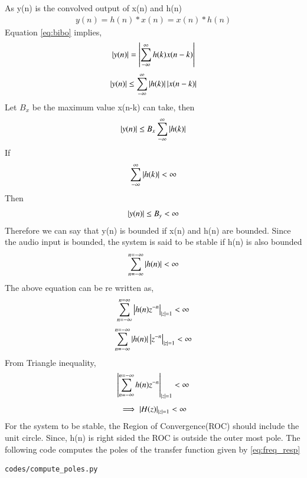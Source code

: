 \documentclass[journal,12pt,twocolumn]{IEEEtran}
\renewcommand\thesection{\arabic{section}}
\begin{document}
\begin{enumerate}[label=\thesection.\arabic*,ref=\thesection.\theenumi]
\begin{equation}
\label{eq:bibo}
\end{equation}
As y(n) is the convolved output of x(n) and h(n)
\begin{align}
y(n)=h(n) * x(n) = x(n) * h(n)
\end{align}
Equation \eqref{eq:bibo} implies,
\begin{equation}
\left\vert y(n)\right\vert = \left\vert\sum_{-\infty}^{\infty} h(k)x(n-k)\right\vert
\end{equation}
\begin{equation}
\left\vert y(n)\right\vert \leq \sum_{-\infty}^{\infty} \left\vert h(k)\right\vert\left\vert x(n-k)\right\vert
\end{equation}
Let $B_{x}$ be the maximum value x(n-k) can take, then
\begin{equation}
\left\vert y(n)\right\vert \leq B_{x}\sum_{-\infty}^{\infty} \left\vert h(k)\right\vert
\end{equation}
If
\begin{equation}
\sum_{-\infty}^{\infty} \left\vert h(k)\right\vert < \infty
\end{equation}
Then
\begin{equation}
\left\vert y(n)\right\vert \leq B_{y} < \infty
\end{equation}
Therefore we can say that y(n) is bounded if x(n) and h(n) are bounded.
Since the audio input is bounded, the system is said to be stable if h(n) is also bounded
\begin{equation}
\sum_{n=-\infty}^{n=-\infty} \left\vert h(n)\right\vert<\infty
\end{equation}
The above equation can be re written as,
\begin{equation}
\sum_{n=-\infty}^{n=\infty} \left\vert h(n)z^{-n}\right\vert_{\left\vert z\right\vert=1}<\infty
\end{equation}
\begin{equation}
\sum_{n=-\infty}^{n=-\infty} \left\vert h(n)\right\vert \left\vert z^{-n}\right\vert_{\left\vert z\right\vert=1}<\infty
\end{equation}
From Triangle inequality,
\begin{equation}
\left\vert\sum_{n=-\infty}^{n=-\infty} h(n)z^{-n}\right\vert_{\left\vert z\right\vert=1}<\infty
\end{equation}
\begin{equation}
\implies \left\vert H(z)\right\vert_{\left\vert z\right\vert=1} < \infty
\end{equation}
For the system to be stable, the Region of Convergence(ROC) should include the unit circle.
Since, h(n) is right sided the ROC is outside the outer most pole. The following code computes the poles of the transfer function given by \eqref{eq:freq_resp}
\begin{lstlisting}
codes/compute_poles.py
\end{lstlisting}

\end{enumerate}
\end{document}
